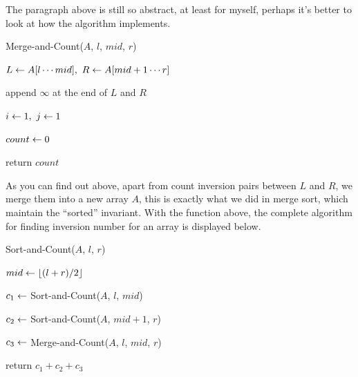 \documentclass[11pt, a4paper]{COMP3711}
\begin{document}
\begin{spacing}{1.5}
    The paragraph above is still so abstract, at least for myself, 
    perhaps it's better to look at how the algorithm implements.\\

    \begin{algorithm}[H]
        \caption{Merge-and-Count($A$, $l$, $mid$, $r$)}


        $L\leftarrow A[l\cdots mid],\ R\leftarrow A[mid+1\cdots r]$

        append $\infty$ at the end of $L$ and $R$

        $i\leftarrow 1,\ j\leftarrow 1$ \qquad {}

        $count \leftarrow 0$  \qquad {}

        return $count$

    \end{algorithm}

    As you can find out above, apart from count inversion pairs 
    between $L$ and $R$, we merge them into a new array $A$,
    this is exactly what we did in merge sort, which maintain
    the ``sorted'' invariant. With the function above, 
    the complete algorithm for finding inversion number for an array is 
    displayed below.

    \begin{algorithm}
        \caption{Sort-and-Count($A$, $l$, $r$)}

        $mid\leftarrow \lfloor (l+r)/2\rfloor$

        $c_1\leftarrow $ Sort-and-Count($A$, $l$, $mid$)

        $c_2\leftarrow $ Sort-and-Count($A$, $mid+1$, $r$)

        $c_3\leftarrow $ Merge-and-Count($A$, $l$, $mid$, $r$)

        return $c_1+c_2+c_3$
    \end{algorithm}


\end{spacing}
\end{document}
